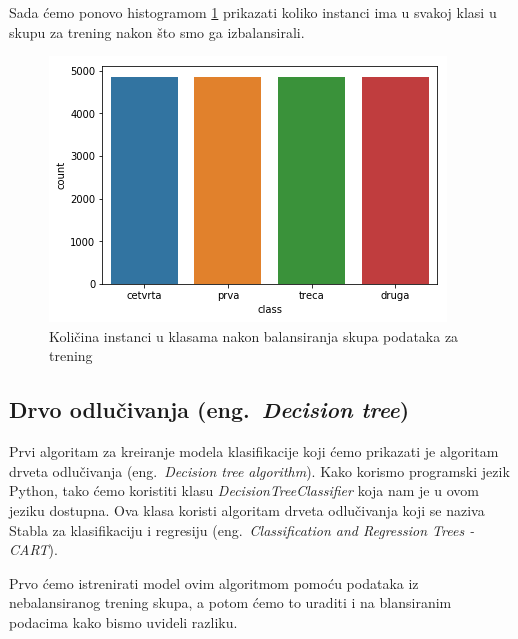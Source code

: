 \documentclass[a4paper]{article}
\begin{document}
Sada ćemo ponovo histogramom \ref{fig:klase_hist_balansirano} prikazati koliko instanci ima u svakoj klasi u skupu za trening nakon što smo ga izbalansirali.


\begin{figure}[h!]
\begin{center}
\includegraphics[scale=0.6]{klase_balansirane_hist.png}
\end{center}
\caption{Količina instanci u klasama nakon balansiranja skupa podataka za trening}
\label{fig:klase_hist_balansirano}
\end{figure}

\subsection{Drvo odlučivanja (eng.~{\em Decision tree})}
Prvi algoritam za kreiranje modela klasifikacije koji ćemo prikazati je algoritam drveta odlučivanja (eng.~{\em Decision tree algorithm}). Kako korismo programski jezik Python, tako ćemo koristiti klasu {\em DecisionTreeClassifier} koja nam je u ovom jeziku dostupna. Ova klasa koristi algoritam drveta odlučivanja koji se naziva Stabla za klasifikaciju i regresiju (eng.~{\em Classification and Regression Trees - CART}). 

Prvo ćemo istrenirati model ovim algoritmom pomoću podataka iz nebalansiranog trening skupa, a potom ćemo to uraditi i na blansiranim podacima kako bismo uvideli razliku. 
\end{document}
